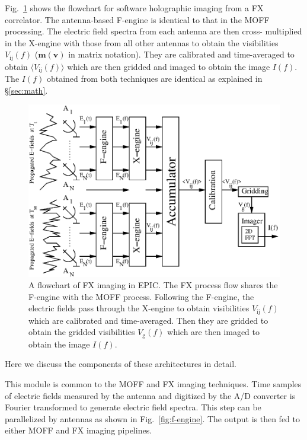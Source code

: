 \documentclass[a4paper,fleqn,usenatbib]{../mnras}
\begin{document}
Fig.~\ref{fig:FX-flowchart} shows the flowchart for software holographic
imaging from a FX correlator. The antenna-based F-engine is identical to that in
the MOFF processing. The electric field spectra from each antenna are then cross-
multiplied in the X-engine with those from all other antennas to obtain the
visibilities $V_\textrm{ij}(f)$ ($\mathbf{m}(\mathbf{v})$ in matrix notation).
They are calibrated and time-averaged to obtain $\langle V_\textrm{ij}(f)\rangle$
which are then gridded and imaged to obtain the image $I(f)$. The $I(f)$ obtained
from both techniques are identical as explained in \S\ref{sec:math}.
\begin{figure}
  \includegraphics[width=\columnwidth]{FX_flowchart.eps}
  \caption{A flowchart of FX imaging in EPIC. The FX process flow shares the
    F-engine with the MOFF process. Following the F-engine, the electric fields
    pass through the X-engine to obtain visibilities $V_\textrm{ij}(f)$ which are
    calibrated and time-averaged. Then they are gridded to obtain the gridded
    visibilities $V_\textrm{g}(f)$ which are then imaged to obtain the image
    $I(f)$.}
  \label{fig:FX-flowchart}
\end{figure}

Here we discuss the components of these architectures in detail. 

\par\medskip
{}
\par\medskip
\noindent This module is common to the MOFF and FX imaging techniques. Time 
samples of electric fields measured by the antenna and digitized by the A/D 
converter is Fourier transformed to generate electric field spectra. This step 
can be parallelized by antennas as shown in Fig.~\ref{fig:f-engine}. The output 
is then fed to either MOFF and FX imaging pipelines.
\end{document}

